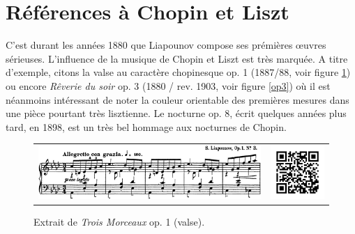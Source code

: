 \section{Références à Chopin et Liszt}

C'est durant les années 1880 que Liapounov compose ses prémières œuvres sérieuses. L'influence de la musique de Chopin et Liszt est très marquée. A titre d'exemple, citons la valse au caractère chopinesque op. 1 (1887/88, voir figure \ref{op1}) ou encore \emph{Rêverie du soir} op. 3 (1880 / rev. 1903, voir figure \ref{op3}) où il est néanmoins intéressant de noter la couleur orientable des premières mesures dans une pièce pourtant très lisztienne. Le nocturne op. 8, écrit quelques années plus tard, en 1898, est un très bel hommage aux nocturnes de Chopin.

\begin{figure}[!ht]
  \begin{bigcenter}
    \begin{tabular}{lr}
      \includegraphics[width=12.5cm, keepaspectratio]{op1.png}
      &
      \includegraphics[width=3cm, keepaspectratio]{op1-qr.png}
    \end{tabular}
  \end{bigcenter}
  \caption{\label{op1}Extrait de \emph{Trois Morceaux} op. 1  (valse).}
\end{figure}

